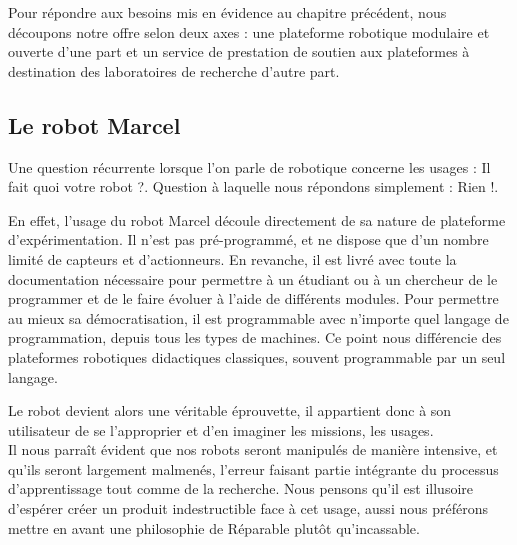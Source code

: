 \documentclass[a4paper,12pt]{report}
\begin{document}
Pour répondre aux besoins mis en évidence au chapitre précédent, nous découpons notre offre selon deux axes :
une plateforme robotique modulaire et ouverte d'une part et un service de prestation de soutien aux plateformes à destination des laboratoires de recherche d'autre part.
\subsection{Le robot Marcel}
Une question récurrente lorsque l'on parle de robotique concerne les usages : \og{}Il fait quoi votre robot ?\fg{}.
Question à laquelle nous répondons simplement : \og{}Rien !\fg{}.

En effet, l'usage du robot Marcel découle directement de sa nature de plateforme d'expérimentation.
Il n'est pas pré-programmé, et ne dispose que d'un nombre limité de capteurs et d'actionneurs.
En revanche, il est livré avec toute la documentation nécessaire pour permettre à un étudiant ou à un chercheur de le programmer et de le faire évoluer à l'aide de différents modules.
Pour permettre au mieux sa démocratisation, il est programmable avec n'importe quel langage de programmation, depuis tous les types de machines.
Ce point nous différencie des plateformes robotiques didactiques classiques, souvent programmable par un seul langage.

Le robot devient alors une véritable éprouvette, il appartient donc à son utilisateur de se l'approprier et d'en imaginer les missions, les usages.\\

Il nous parraît évident que nos robots seront manipulés de manière intensive, et qu'ils seront largement malmenés, 
l'erreur faisant partie intégrante du processus d'apprentissage tout comme de la recherche.
Nous pensons qu'il est illusoire d'espérer créer un produit indestructible face à cet usage, aussi nous préférons mettre en avant une philosophie de \og{}Réparable plutôt qu'incassable\fg{}.
\end{document}
